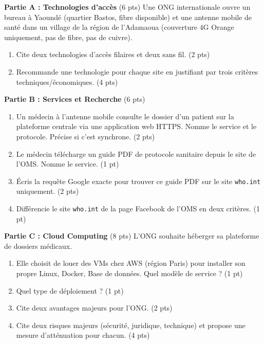 \documentclass[11pt]{article}
\begin{document}
\begin{exercice}
\textbf{Partie A : Technologies d'accès} (6 pts)
Une ONG internationale ouvre un bureau à Yaoundé (quartier Bastos, fibre disponible) et une antenne mobile de santé dans un village de la région de l'Adamaoua (couverture 4G Orange uniquement, pas de fibre, pas de cuivre).
\begin{enumerate}
\item Cite deux technologies d'accès filaires et deux sans fil. (2 pts)
\item Recommande une technologie pour chaque site en justifiant par trois critères techniques/économiques. (4 pts)
\end{enumerate}

\textbf{Partie B : Services et Recherche} (6 pts)
\begin{enumerate}
\item Un médecin à l'antenne mobile consulte le dossier d'un patient sur la plateforme centrale via une application web HTTPS. Nomme le service et le protocole. Précise si c'est synchrone. (2 pts)
\item Le médecin télécharge un guide PDF de protocole sanitaire depuis le site de l'OMS. Nomme le service. (1 pt)
\item Écris la requête Google exacte pour trouver ce guide PDF sur le site \texttt{who.int} uniquement. (2 pts)
\item Différencie le site \texttt{who.int} de la page Facebook de l'OMS en deux critères. (1 pt)
\end{enumerate}

\textbf{Partie C : Cloud Computing} (8 pts)
L'ONG souhaite héberger sa plateforme de dossiers médicaux.
\begin{enumerate}
\item Elle choisit de louer des VMs chez AWS (région Paris) pour installer son propre Linux, Docker, Base de données. Quel modèle de service ? (1 pt)
\item Quel type de déploiement ? (1 pt)
\item Cite deux avantages majeurs pour l'ONG. (2 pts)
\item Cite deux risques majeurs (sécurité, juridique, technique) et propose une mesure d'atténuation pour chacun. (4 pts)
\end{enumerate}
\end{exercice}
\end{document}
